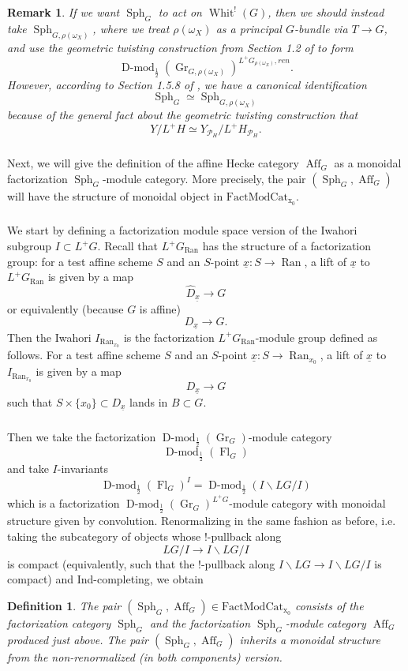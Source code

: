 \documentclass[10pt,a4paper]{amsart}
\newtheorem{defn}[subsubsection]{Definition}
\newtheorem{rem}[subsubsection]{Remark}
\newcommand{\on}[1]{\operatorname{#1}}
\newcommand{\Dmodh}{\on{D-mod}_{\frac{1}{2}}}
\newcommand{\Ran}{\on{Ran}}
\newcommand{\FactModCat}{\on{FactModCat_{x_0}}}
\newcommand{\sssec}[1]{\subsubsection{}}
\begin{document}
\begin{rem}
    If we want $\on{Sph}_G$ to act on $\on{Whit}^!(G)$, then we should instead take $\on{Sph}_{G, \rho(\omega_X)}$, where we treat $\rho(\omega_X)$ as a principal $G$-bundle via $T \to G$, and use the geometric twisting construction from Section 1.2 of \cite{GLC2} to form
    $$
    \Dmodh(\on{Gr}_{G, \rho(\omega_X)})^{L^+G_{\rho(\omega_X)}, ren}.
    $$
    However, according to Section 1.5.8 of \cite{GLC2}, we have a canonical identification
    $$
    \on{Sph}_G \simeq \on{Sph}_{G, \rho(\omega_X)}
    $$
    because of the general fact about the geometric twisting construction that
    $$
    Y/L^+H \simeq Y_{\mathcal{P}_H}/L^+H_{\mathcal{P}_H}.
    $$
\end{rem}

\sssec{}
Next, we will give the definition of the affine Hecke category $\on{Aff}_G$ as a monoidal factorization $\on{Sph}_G$-module category. More precisely, the pair $(\on{Sph}_G, \on{Aff}_G)$ will have the structure of monoidal object in $\FactModCat$.

\sssec{}
We start by defining a factorization module space version of the Iwahori subgroup $I \subset L^+G$. Recall that $L^+G_{\Ran}$ has the structure of a factorization group: for a test affine scheme $S$ and an $S$-point $\underline{x}: S \to \Ran$, a lift of $\underline{x}$ to $L^+G_{\Ran}$ is given by a map
$$
\hat{D}_{\underline{x}} \to G 
$$
or equivalently (because $G$ is affine)
$$
D_{\underline{x}} \to G.
$$
Then the Iwahori $I_{\Ran_{x_0}}$ is the factorization $L^+G_{\Ran}$-module group defined as follows. For a test affine scheme $S$ and an $S$-point $\underline{x}: S \to \Ran_{x_0}$, a lift of $\underline{x}$ to $I_{\on{Ran}_{x_0}}$ is given by a map
$$
D_{\underline{x}} \to G
$$
such that $S \times \{x_0\} \subset D_{\underline{x}}$ lands in $B \subset G$.

\sssec{}
Then we take the factorization $\Dmodh(\on{Gr}_G)$-module category
$$
\Dmodh(\on{Fl}_G)
$$
and take $I$-invariants
$$
\Dmodh(\on{Fl}_G)^{I} = \Dmodh(I\backslash LG/I)
$$
which is a factorization $\Dmodh(\on{Gr}_G)^{L^+G}$-module category with monoidal structure given by convolution. Renormalizing in the same fashion as before, i.e. taking the subcategory of objects whose $!$-pullback along
$$
LG/I \to I\backslash LG/I
$$
is compact (equivalently, such that the $!$-pullback along $I\backslash LG \to I\backslash LG/I$ is compact) and Ind-completing, we obtain

\begin{defn}
    The pair $(\on{Sph}_G, \on{Aff}_G) \in \FactModCat$ consists of the factorization category $\on{Sph}_G$ and the factorization $\on{Sph}_G$-module category $\on{Aff}_G$ produced just above. The pair $(\on{Sph}_G, \on{Aff}_G)$ inherits a monoidal structure from the non-renormalized (in both components) version.
\end{defn}
\end{document}
